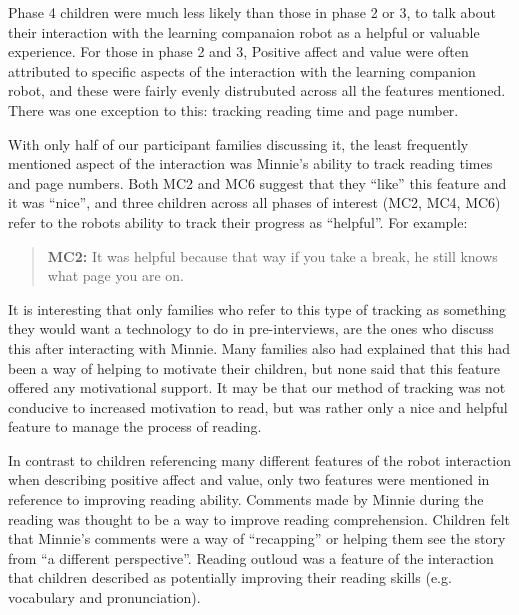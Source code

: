 \documentclass{sigchi}
\begin{document}
Phase 4 children were much less likely than those in phase 2 or 3, to talk about their interaction with the learning companaion robot as a helpful or valuable experience. For those in phase 2 and 3, Positive affect and value were often attributed to specific aspects of the interaction with the learning companion robot, and these were fairly evenly distrubuted across all the features mentioned. There was one exception to this: tracking reading time and page number.
	
With only half of our participant families discussing it, the least frequently mentioned aspect of the interaction was Minnie's ability to track reading times and page numbers. Both MC2 and MC6 suggest that they ``like'' this feature and it was ``nice'', and three children across all phases of interest (MC2, MC4, MC6) refer to the robots ability to track their progress as ``helpful''. For example: 
	
	\begin{quote}
	\textbf{MC2:} It was helpful because that way if you take a break, he still knows what page you are on.
	\end{quote}
	
It is interesting that only families who refer to this type of tracking as something they would want a technology to do in pre-interviews, are the ones who discuss this after interacting with Minnie. Many families also had explained that this had been a way of helping to motivate their children, but none said that this feature offered any motivational support. It may be that our method of tracking was not conducive to increased motivation to read, but was rather only a nice and helpful feature to manage the process of reading.

In contrast to children referencing many different features of the robot interaction when describing positive affect and value, only two features were mentioned in reference to improving reading ability. Comments made by Minnie during the reading was thought to be a way to improve reading comprehension. Children felt that Minnie's comments were a way of ``recapping'' or helping them see the story from ``a different perspective''. Reading outloud was a feature of the interaction that children described as potentially improving their reading skills (e.g. vocabulary and pronunciation).
\end{document}
